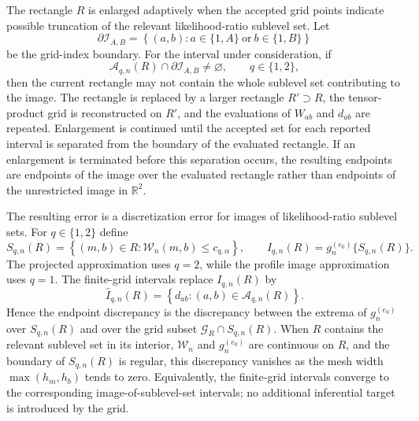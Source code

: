 \documentclass[11pt]{article}
\begin{document}
The rectangle $R$ is enlarged adaptively when the accepted grid points indicate possible truncation of the relevant likelihood-ratio sublevel set. Let
\[
  \partial\mathcal{I}_{A,B}
  =
  \left\{
    (a,b):
    a\in\{1,A\}\ \text{or}\ b\in\{1,B\}
  \right\}
\]
be the grid-index boundary. For the interval under consideration, if
\[
  \mathcal{A}_{q,n}(R)\cap\partial\mathcal{I}_{A,B}\neq\varnothing,
  \qquad q\in\{1,2\},
\]
then the current rectangle may not contain the whole sublevel set contributing to the image. The rectangle is replaced by a larger rectangle $R'\supset R$, the tensor-product grid is reconstructed on $R'$, and the evaluations of $W_{ab}$ and $d_{ab}$ are repeated. Enlargement is continued until the accepted set for each reported interval is separated from the boundary of the evaluated rectangle. If an enlargement is terminated before this separation occurs, the resulting endpoints are endpoints of the image over the evaluated rectangle rather than endpoints of the unrestricted image in $\mathbb{R}^2$.

The resulting error is a discretization error for images of likelihood-ratio sublevel sets. For $q\in\{1,2\}$ define
\[
  S_{q,n}(R)
  =
  \left\{
    (m,b)\in R:
    \mathcal{W}_n(m,b)\leq c_{q,\alpha}
  \right\},
  \qquad
  I_{q,n}(R)=g_n^{(e_0)}\{S_{q,n}(R)\}.
\]
The projected approximation uses $q=2$, while the profile image approximation uses $q=1$. The finite-grid intervals replace $I_{q,n}(R)$ by
\[
  \widehat{I}_{q,n}(R)
  =
  \left\{
    d_{ab}:
    (a,b)\in\mathcal{A}_{q,n}(R)
  \right\}.
\]
Hence the endpoint discrepancy is the discrepancy between the extrema of $g_n^{(e_0)}$ over $S_{q,n}(R)$ and over the grid subset $\mathcal{G}_R\cap S_{q,n}(R)$. When $R$ contains the relevant sublevel set in its interior, $\mathcal{W}_n$ and $g_n^{(e_0)}$ are continuous on $R$, and the boundary of $S_{q,n}(R)$ is regular, this discrepancy vanishes as the mesh width $\max(h_m,h_b)$ tends to zero. Equivalently, the finite-grid intervals converge to the corresponding image-of-sublevel-set intervals; no additional inferential target is introduced by the grid.
\clearpage


\end{document}
